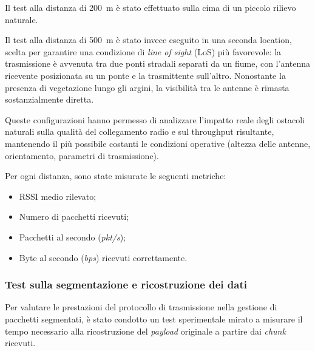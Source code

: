 \documentclass[12pt,a4paper,twoside]{book}
\begin{document}
Il test alla distanza di 200~m è stato effettuato sulla cima di un piccolo rilievo naturale.

Il test alla distanza di 500~m è stato invece eseguito in una seconda location,
scelta per garantire una condizione di \emph{line of sight} (LoS) più favorevole:
la trasmissione è avvenuta tra due ponti stradali separati da un fiume, con l’antenna
ricevente posizionata su un ponte e la trasmittente sull'altro. Nonostante la presenza
di vegetazione lungo gli argini, la visibilità tra le antenne è rimasta sostanzialmente diretta.

Queste configurazioni hanno permesso di analizzare l'impatto reale degli ostacoli naturali
sulla qualità del collegamento radio e sul throughput risultante, mantenendo il
più possibile costanti le condizioni operative (altezza delle antenne, orientamento,
parametri di trasmissione).

Per ogni distanza, sono state misurate le seguenti metriche:
\begin{itemize}
    \item \ac{RSSI} medio rilevato;
    \item Numero di pacchetti ricevuti;
    \item Pacchetti al secondo (\emph{pkt/s});
    \item Byte al secondo (\emph{bps}) ricevuti correttamente.
\end{itemize}

\newpage
\subsubsection{Test sulla segmentazione e ricostruzione dei dati}
\begin{table}[H]
    \centering
    \caption{Condizioni del test di segmentazione e ricostruzione dei dati.}
    \label{tab:T2-conditions}
\end{table}

Per valutare le prestazioni del protocollo di trasmissione nella gestione di pacchetti segmentati,
è stato condotto un test sperimentale mirato a misurare il tempo necessario alla ricostruzione
del \emph{payload} originale a partire dai \emph{chunk} ricevuti.
\end{document}
